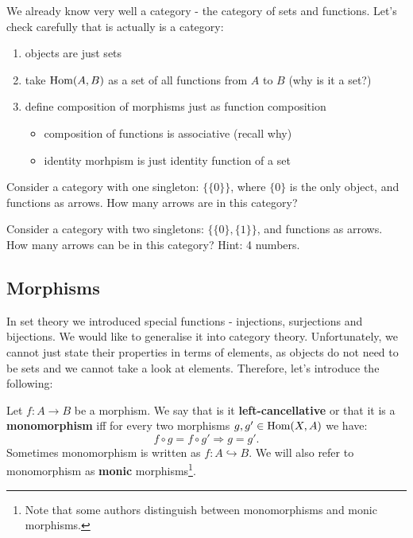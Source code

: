 \begin{example}
  We already know very well a category - the category of sets and functions. Let's check carefully that is actually is a category:
  \begin{enumerate}
    \item objects are just sets
    \item take $\text{Hom}(A,B)$ as a set of all functions from $A$ to $B$ (why is it a set?)
    \item define composition of morphisms just as function composition
      \begin{itemize}
        \item composition of functions is associative (recall why)
        \item identity morhpism is just identity function of a set
      \end{itemize}
  \end{enumerate}
\end{example}

\begin{exercise}
  Consider a category with one singleton: $\{\{0\}\}$, where $\{0\}$ is the only object, and functions as arrows. How many arrows are in this category?
\end{exercise}

\begin{exercise}
  Consider a category with two singletons: $\{\{0\}, \{1\}\}$, and functions as arrows. How many arrows can be in this category? Hint: 4 numbers.
\end{exercise}

\subsection{Morphisms}
In set theory we introduced special functions - injections, surjections and bijections. We would like to generalise it into category theory. Unfortunately, we cannot just state their properties in terms
of elements, as objects do not need to be sets and we cannot take a look at elements. Therefore, let's introduce the following:

\begin{definition}
  Let $f: A\to B$ be a morphism. We say that is it \textbf{left-cancellative} or that it is a \textbf{monomorphism} iff for every two morphisms $g,g' \in \text{Hom}(X,A)$ we have:
  $$f\circ g = f\circ g'\Rightarrow g=g'.$$
  Sometimes monomorphism is written as $f: A\hookrightarrow B$. We will also refer to monomorphism as \textbf{monic} morphisms\footnote{Note that some authors distinguish between monomorphisms and monic
  morphisms.}.
\end{definition}

